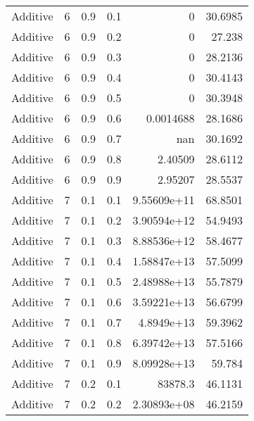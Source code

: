 \documentclass{article}
\begin{document}
\begin{longtable}[H]{lrrrrr}
 Additive       &       6 &   0.9 &            0.1 &      0           &         30.6985 \\
 Additive       &       6 &   0.9 &            0.2 &      0           &         27.238  \\
 Additive       &       6 &   0.9 &            0.3 &      0           &         28.2136 \\
 Additive       &       6 &   0.9 &            0.4 &      0           &         30.4143 \\
 Additive       &       6 &   0.9 &            0.5 &      0           &         30.3948 \\
 Additive       &       6 &   0.9 &            0.6 &      0.0014688   &         28.1686 \\
 Additive       &       6 &   0.9 &            0.7 &    nan           &         30.1692 \\
 Additive       &       6 &   0.9 &            0.8 &      2.40509     &         28.6112 \\
 Additive       &       6 &   0.9 &            0.9 &      2.95207     &         28.5537 \\
 Additive       &       7 &   0.1 &            0.1 &      9.55609e+11 &         68.8501 \\
 Additive       &       7 &   0.1 &            0.2 &      3.90594e+12 &         54.9493 \\
 Additive       &       7 &   0.1 &            0.3 &      8.88536e+12 &         58.4677 \\
 Additive       &       7 &   0.1 &            0.4 &      1.58847e+13 &         57.5099 \\
 Additive       &       7 &   0.1 &            0.5 &      2.48988e+13 &         55.7879 \\
 Additive       &       7 &   0.1 &            0.6 &      3.59221e+13 &         56.6799 \\
 Additive       &       7 &   0.1 &            0.7 &      4.8949e+13  &         59.3962 \\
 Additive       &       7 &   0.1 &            0.8 &      6.39742e+13 &         57.5166 \\
 Additive       &       7 &   0.1 &            0.9 &      8.09928e+13 &         59.784  \\
 Additive       &       7 &   0.2 &            0.1 &  83878.3         &         46.1131 \\
 Additive       &       7 &   0.2 &            0.2 &      2.30893e+08 &         46.2159 \\

\end{longtable}
\end{document}

